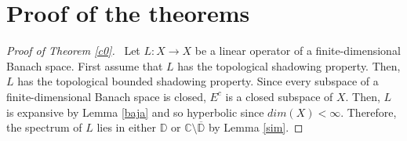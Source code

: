\documentclass[11pt,letterpaper]{amsart}
\numberwithin{equation}{section}
\begin{document}
\section{Proof of the theorems}
\label{sec3}




\begin{proof}[Proof of Theorem \ref{c0}]\,
Let $L:X\to X$ be a linear operator of a finite-dimensional Banach space.
First assume that $L$ has the topological shadowing property.
Then, $L$ has the topological bounded shadowing property.
Since every subspace of a finite-dimensional Banach space is closed,
$E^c$ is a closed subspace of $X$. Then, $L$ is expansive by Lemma \ref{baja}
and so hyperbolic since $dim(X)<\infty$.
Therefore, the spectrum of $L$ lies in either $\mathbb{D}$ or $\mathbb{C}\setminus \overline{\mathbb{D}}$ by Lemma \ref{sim}.


\end{proof}
\end{document}
